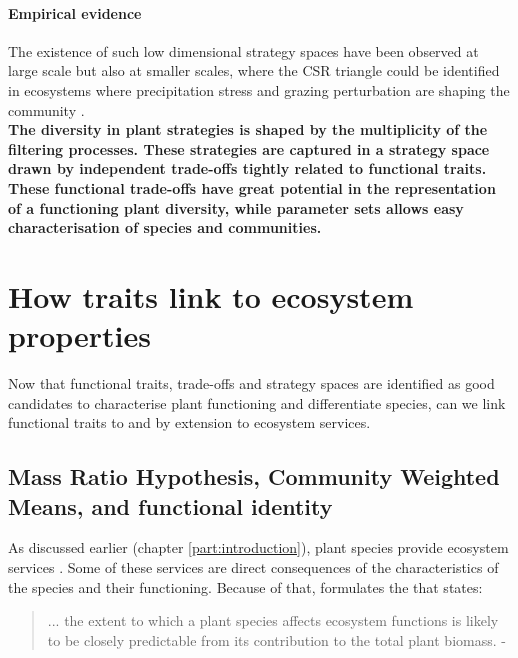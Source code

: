 \paragraph{Empirical evidence}

The existence of such low dimensional strategy spaces have been observed at large scale \parencite{ pierce_allocating_2013, diaz_global_2016} but also at smaller scales, where the CSR triangle could be identified in ecosystems where precipitation stress and grazing perturbation are shaping the community \parencite{frenette-dussault_functional_2012}.\\

\textbf{The diversity in plant strategies is shaped by the multiplicity of the filtering processes. These strategies are captured in a strategy space drawn by independent trade-offs tightly related to functional traits. These functional trade-offs have great potential in the representation of a functioning plant diversity, while parameter sets allows easy characterisation of species and communities.}



\section{How traits link to ecosystem properties}

Now that functional traits, trade-offs and strategy spaces are identified as good candidates to characterise plant functioning and differentiate species, can we link functional traits to  and by extension to ecosystem services.

\subsection{Mass Ratio Hypothesis, Community Weighted Means, and functional identity}

As discussed earlier (chapter \ref{part:introduction}), plant species provide ecosystem services \parencite{mokany_functional_2008}. Some of these services are direct consequences of the characteristics of the species and their functioning. Because of that, \citet{grime_benefits_1998} formulates the  that states: 

\begin{quotation}
... the extent to which a plant species affects ecosystem functions is likely to be closely predictable from its contribution to the total plant biomass. - \citet{grime_benefits_1998}
\end{quotation}

